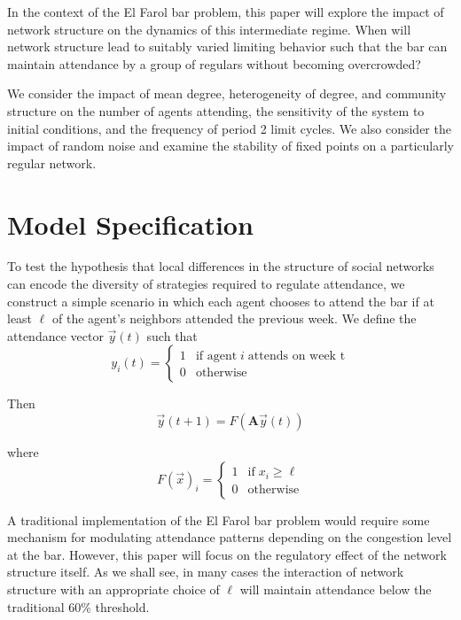 \documentclass[12pt]{article}
\begin{document}
In the context of the El Farol bar problem, this paper will explore the impact of network structure on the dynamics of this intermediate regime.  When will network structure lead to suitably varied limiting behavior such that the bar can maintain attendance by a group of regulars without becoming overcrowded?  

We consider the impact of mean degree, heterogeneity of degree, and community structure on the number of agents attending, the sensitivity of the system to initial conditions, and the frequency of period 2 limit cycles.  We also consider the impact of random noise and examine the stability of fixed points on a particularly regular network.

\section{Model Specification}
To test the hypothesis that local differences in the structure of social networks can encode the diversity of strategies required to regulate attendance, we construct a simple scenario in which each agent chooses to attend the bar if at least $\ell$ of the agent's neighbors attended the previous week.  We define the attendance vector $\vec{y}(t)$ such that
\begin{equation}
  y_i(t) = \begin{cases}
    1 &\text{if agent}\; i \; \text{attends on week t} \\
    0 &\text{otherwise}
  \end{cases}
\end{equation}

Then 
\begin{equation}
  \vec{y}(t + 1) = F(\mathbf{A}\vec{y}(t))
\end{equation}

where
\begin{equation}
  F(\vec{x})_i = \begin{cases}
    1 &\text{if} \; x_i \geq \ell \\
    0 &\text{otherwise}
  \end{cases}
\end{equation}

A traditional implementation of the El Farol bar problem would require some mechanism for modulating attendance patterns depending on the congestion level at the bar.  However, this paper will focus on the regulatory effect of the network structure itself.  As we shall see, in many cases the interaction of network structure with an appropriate choice of $\ell$ will maintain attendance below the traditional 60\% threshold. 
\end{document}

